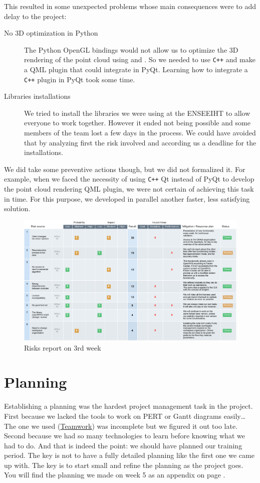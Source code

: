 This resulted in some unexpected problems whose main consequences were
to add delay to the project:

\begin{description}
\item[No 3D optimization in Python] The Python OpenGL bindings would
  not allow us to optimize the 3D rendering of the point cloud using
   and . So we needed
  to use \verb!C++! and make a QML plugin that could integrate in
  PyQt. Learning how to integrate a \verb!C++! plugin in PyQt took some time.
\item[Libraries installations] We tried to install the libraries we
  were using at the ENSEEIHT to allow everyone to work
  together. However it ended not being possible and some members of
  the team lost a few days in the process. We could have avoided that
  by analyzing first the risk involved and according us a deadline for
  the installations.
\end{description}

We did take some preventive actions though, but we did not formalized
it. For example, when we faced the necessity of using \verb!C++! Qt instead
of PyQt to develop the point cloud rendering QML plugin, we were not
certain of achieving this task in time. For this purpose, we developed
in parallel another faster, less satisfying solution.


\begin{figure}[!htbp]
  \centering
  \includegraphics[width=\linewidth]{img/risks.pdf}
  \caption{Risks report on 3rd week}
  \label{fig:risks}
\end{figure}

\section{Planning}

Establishing a planning was the hardest project management task in the
project. First because we lacked the tools to work on PERT or Gantt
diagrams easily\ldots The one we used
(\href{https://www.teamwork.com/}{Teamwork}) was incomplete but we
figured it out too late. Second because we had so many technologies to
learn before knowing what we had to do. And that is indeed the point:
we should have planned our training period. The key is not to have a
fully detailed planning like the first one we came up with. The key is
to start small and refine the planning as the project goes. You will
find the planning we made on week 5 as an appendix on page
\pageref{app:planning}.
